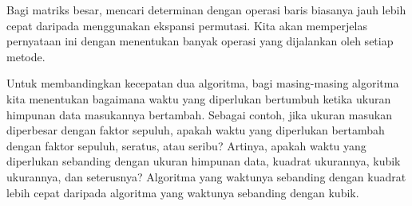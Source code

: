 Bagi matriks besar, mencari determinan dengan operasi baris biasanya jauh lebih
cepat daripada menggunakan ekspansi permutasi.
Kita akan memperjelas pernyataan ini dengan menentukan banyak operasi yang
dijalankan oleh setiap metode.

Untuk membandingkan kecepatan dua algoritma, bagi masing-masing algoritma kita
menentukan bagaimana waktu yang diperlukan bertumbuh ketika ukuran himpunan data
masukannya bertambah.
Sebagai contoh, jika ukuran masukan diperbesar dengan faktor sepuluh, apakah
waktu yang diperlukan bertambah dengan faktor sepuluh, seratus, atau seribu?
Artinya, apakah waktu yang diperlukan sebanding dengan ukuran himpunan data,
kuadrat ukurannya, kubik ukurannya, dan seterusnya?
Algoritma yang waktunya sebanding dengan kuadrat lebih cepat daripada algoritma
yang waktunya sebanding dengan kubik.

